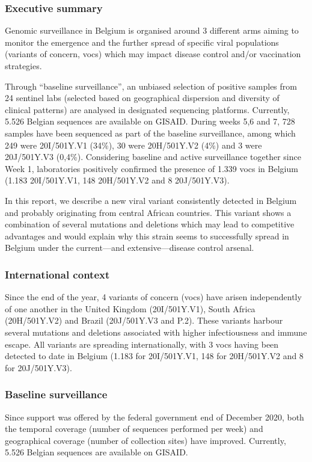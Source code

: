 \subsubsection{Executive summary}
Genomic surveillance in Belgium is organised around 3 different arms aiming to monitor the emergence and the further spread of specific viral populations (variants of concern, \gls{voc}s) which may impact disease control and/or vaccination strategies.

Through ``baseline surveillance'', an unbiased selection of positive samples from 24 sentinel labs (selected based on geographical dispersion and diversity of clinical patterns) are analysed in designated sequencing platforms.
Currently, 5.526 Belgian sequences are available on GISAID. During weeks 5,6 and 7, 728 samples have been sequenced as part of the baseline surveillance, among which 249 were 20I/501Y.V1 (34\%), 30 were 20H/501Y.V2 (4\%) and 3 were 20J/501Y.V3 (0,4\%).
Considering baseline and active surveillance together since Week 1, laboratories positively confirmed the presence of 1.339 \gls{voc}s in Belgium (1.183 20I/501Y.V1, 148 20H/501Y.V2 and 8 20J/501Y.V3).

In this report, we describe a new viral variant consistently detected in Belgium and probably originating from central African countries.
This variant shows a combination of several mutations and deletions which may lead to competitive advantages and would explain why this strain seems to successfully spread in Belgium under the current---and extensive---disease control arsenal.

\subsubsection{International context}
Since the end of the year, 4 variants of concern (\gls{voc}s) have arisen independently of one another in the United Kingdom (20I/501Y.V1), South Africa (20H/501Y.V2) and Brazil (20J/501Y.V3 and P.2).
These variants harbour several mutations and deletions associated with higher infectiousness and immune escape.
All variants are spreading internationally, with 3 \gls{voc}s having been detected to date in Belgium (1.183 for 20I/501Y.V1, 148 for 20H/501Y.V2 and 8 for 20J/501Y.V3).

\subsubsection{Baseline surveillance}
Since support was offered by the federal government end of December 2020, both the temporal coverage (number of sequences performed per week) and geographical coverage (number of collection sites) have improved.
Currently, 5.526 Belgian sequences are available on GISAID.

